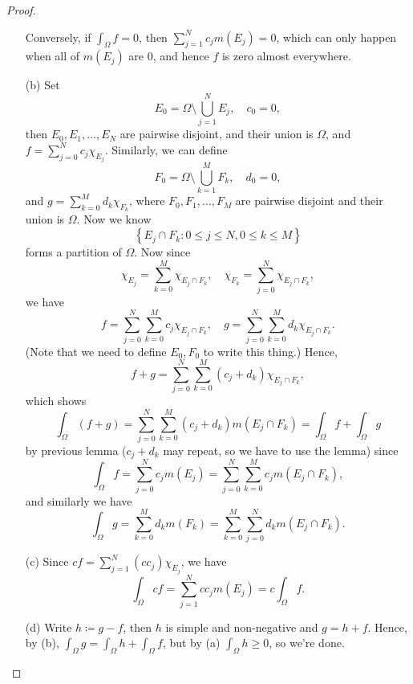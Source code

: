 \begin{proof}
\begin{itemize}
        Conversely, if \(\int _\Omega f = 0\), then \(\sum_{j=1}^N c_j m(E_j) = 0 \), which can only happen when all of \(m(E_j)\) are \(0\), and hence \(f\) is zero almost everywhere.    
        \item [(b)] Set 
        \[
            E_0 = \Omega \setminus \bigcup_{j=1}^{N} E_j, \quad c_0 = 0, 
        \]
        then \(E_0, E_1, \dots , E_N\) are pairwise disjoint, and their union is \(\Omega\), and \(f = \sum_{j=0}^N c_j \chi _{E_j} \). Similarly, we can define 
        \[
            F_0 = \Omega \setminus \bigcup_{k=1}^{M} F_k, \quad d_0 = 0,
        \]  
        and \(g = \sum_{k=0}^M d_k \chi _{F_k} \), where \(F_0, F_1, \dots , F_M\) are pairwise disjoint and their union is \(\Omega\). Now we know 
        \[
            \left\{ E_j \cap F_k: 0 \le j \le N, 0 \le k \le M \right\}
        \] 
        forms a partition of \(\Omega\). Now since 
        \[
            \chi _{E_j} = \sum_{k=0}^M \chi _{E_j \cap F_k}, \quad \chi _{F_k} = \sum_{j=0}^N \chi _{E_j \cap F_k},  
        \]  
        we have 
        \[
            f = \sum_{j=0}^N \sum_{k=0}^M c_j \chi _{E_j \cap F_k}, \quad g = \sum_{j=0}^N \sum_{k=0}^M d_k \chi _{E_j \cap F_k}. 
        \]
        (Note that we need to define \(E_0, F_0\) to write this thing.)
        Hence, 
        \[
            f + g = \sum_{j=0}^N \sum_{k=0}^M (c_j + d_k) \chi _{E_j \cap F_k},  
        \]
        which shows 
        \[
            \int _\Omega (f + g) = \sum_{j=0}^N \sum_{k=0}^M (c_j + d_k) m(E_j \cap F_k) = \int _\Omega f + \int _\Omega g
        \]
        by previous lemma (\(c_j + d_k\) may repeat, so we have to use the lemma) since 
        \[
            \int _\Omega f = \sum_{j=0}^N c_j m(E_j) = \sum_{j=0}^N \sum_{k=0}^M c_j m(E_j \cap F_k),   
        \]
        and similarly we have 
        \[
            \int _\Omega g = \sum_{k=0}^M d_k m(F_k) = \sum_{k=0}^M \sum_{j=0}^N d_k m(E_j \cap F_k).   
        \]
        \item [(c)] Since \(c f = \sum_{j=1}^N (cc_j) \chi _{E_j} \), we have 
        \[
            \int _\Omega cf = \sum_{j=1}^N cc_j m(E_j) = c \int _\Omega f. 
        \]
        \item [(d)] Write \(h \coloneqq g - f\), then \(h\) is simple and non-negative and \(g = h + f\). Hence, by (b), \(\int _\Omega g = \int _\Omega h + \int _\Omega f\), but by (a) \(\int _\Omega h \ge 0\), so we're done.    
    \end{itemize}   
                
\end{proof}

